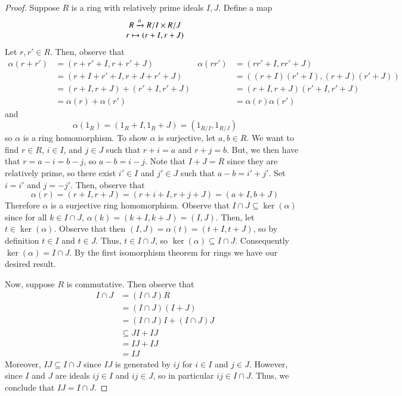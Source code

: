 \begin{proof}
    Suppose $R$ is a ring with relatively prime ideals $I, J$. Define a map $$\begin{array}{c} R\xrightarrow{\alpha} R/I \times R/J \\ r \mapsto (r+I, r+J) \end{array}$$
    Let $r,r' \in R$. Then, observe that \begin{align*}
        \alpha(r+r') &= (r+r' + I, r+r' + J) & \alpha(rr') &= (rr' + I, rr' + J) \\
        &= (r+I+r'+I,r+J + r'+J) & &= ((r+I)(r'+I),(r+J)(r'+J)) \\
        &= (r+I,r+J)+(r'+I,r'+J) & &= (r+I,r+J)(r'+I,r'+J) \\
        &= \alpha(r) + \alpha(r') & &= \alpha(r)\alpha(r')
    \end{align*}
    and $$\alpha(1_R) = (1_R + I, 1_R+J) = (1_{R/I},1_{R/J})$$
    so $\alpha$ is a ring homomorphism. To show $\alpha$ is surjective, let $a,b \in R$. We want to find $r \in R$, $i \in I$, and $j \in J$ such that $r+i = a$ and $r+j = b$. But, we then have that $r = a-i = b-j$, so $a-b = i-j$. Note that $I+J = R$ since they are relatively prime, so there exist $i' \in I$ and $j' \in J$ such that $a-b = i' + j'$. Set $i = i'$ and $j = -j'$. Then, observe that $$\alpha(r) = (r+I,r+J) = (r+i + I, r+j + J) = (a+I, b+J)$$
    Therefore $\alpha$ is a surjective ring homomorphism. Observe that $I\cap J \subseteq \ker(\alpha)$ since for all $k \in I \cap J$, $\alpha(k) = (k+I,k+J) = (I,J)$. Then, let $t \in \ker(\alpha)$. Observe that then $(I,J) = \alpha(t) = (t+I,t+J)$, so by definition $t \in I$ and $t \in J$. Thus, $t \in I \cap J$, so $\ker(\alpha) \subseteq I \cap J$. Consequently $\ker(\alpha) = I \cap J$. By the first isomorphism theorem for rings we have our desired result. 
    
    
    Now, suppose $R$ is commutative. Then observe that \begin{align*}
        I \cap J &= (I\cap J)R \\
        &= (I\cap J)(I+J) \\
        &= (I\cap J)I + (I\cap J)J \\
        &\subseteq JI + IJ \\
        &= IJ + IJ \\
        &= IJ
    \end{align*}
    Moreover, $IJ \subseteq I \cap J$ since $IJ$ is generated by $ij$ for $i \in I$ and $j \in J$. However, since $I$ and $J$ are ideals $ij \in I$ and $ij \in J$, so in particular $ij \in I \cap J$. Thus, we conclude that $IJ = I\cap J$.
\end{proof}

